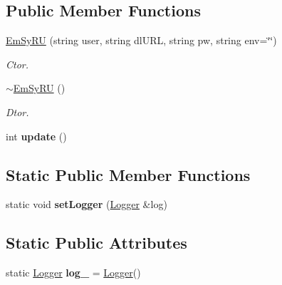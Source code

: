 \subsection*{Public Member Functions}
\begin{DoxyCompactItemize}
\item 
\hypertarget{classEmSyRU_ac5d6a38500bc912eba862a14cfb0b1b2}{\hyperlink{classEmSyRU_ac5d6a38500bc912eba862a14cfb0b1b2}{Em\-Sy\-R\-U} (string user, string dl\-U\-R\-L, string pw, string env=\char`\"{}\char`\"{})}\label{classEmSyRU_ac5d6a38500bc912eba862a14cfb0b1b2}

\begin{DoxyCompactList}\small\item\em Ctor. \end{DoxyCompactList}\item 
\hypertarget{classEmSyRU_abad85d79a8bd0176f4a7f95d1df2f03e}{\hyperlink{classEmSyRU_abad85d79a8bd0176f4a7f95d1df2f03e}{$\sim$\-Em\-Sy\-R\-U} ()}\label{classEmSyRU_abad85d79a8bd0176f4a7f95d1df2f03e}

\begin{DoxyCompactList}\small\item\em Dtor. \end{DoxyCompactList}\item 
\hypertarget{classEmSyRU_aeccfb365e5aac8a9b5fee2557645353d}{int {\bfseries update} ()}\label{classEmSyRU_aeccfb365e5aac8a9b5fee2557645353d}

\end{DoxyCompactItemize}
\subsection*{Static Public Member Functions}
\begin{DoxyCompactItemize}
\item 
\hypertarget{classEmSyRU_a2720ea250a00225d5640145fecc66ff2}{static void {\bfseries set\-Logger} (\hyperlink{classLogger}{Logger} \&log)}\label{classEmSyRU_a2720ea250a00225d5640145fecc66ff2}

\end{DoxyCompactItemize}
\subsection*{Static Public Attributes}
\begin{DoxyCompactItemize}
\item 
\hypertarget{classEmSyRU_a63f349fb8a0000e9fec67de2cabfd216}{static \hyperlink{classLogger}{Logger} {\bfseries log\-\_\-} = \hyperlink{classLogger}{Logger}()}\label{classEmSyRU_a63f349fb8a0000e9fec67de2cabfd216}

\end{DoxyCompactItemize}


